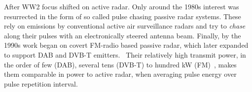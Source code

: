 After WW2 focus shifted on active radar. Only around the 1980s interest was resurrected in the form of so called pulse chasing passive radar systems. These rely on emissions by  conventional active air surveillance radars and try to \emph{chase} along their pulses with an electronically steered antenna beam. Finally, by the 1990s work began on covert FM-radio based passive radar, which later expanded to support DAB and DVB-T emitters.~\cite{Kuschel2013} Their relatively high transmit power, in the order of few (DAB), several tens (DVB-T) to hundred \si{\kilo\watt} (FM)~\cite[p.~48, 57, 64]{Malanowski2019}, makes them comparable in power to active radar, when averaging pulse energy over pulse repetition interval.
